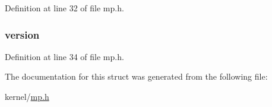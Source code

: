 Definition at line 32 of file mp.\-h.

\hypertarget{structmpproc_aa6ea6b1d12a723848cc34b199ddd8aef}{
\subsubsection[{version}]{ version}}\label{structmpproc_aa6ea6b1d12a723848cc34b199ddd8aef}


Definition at line 34 of file mp.\-h.



The documentation for this struct was generated from the following file\-:\begin{DoxyCompactItemize}
\item 
kernel/\hyperlink{mp_8h}{mp.\-h}\end{DoxyCompactItemize}
